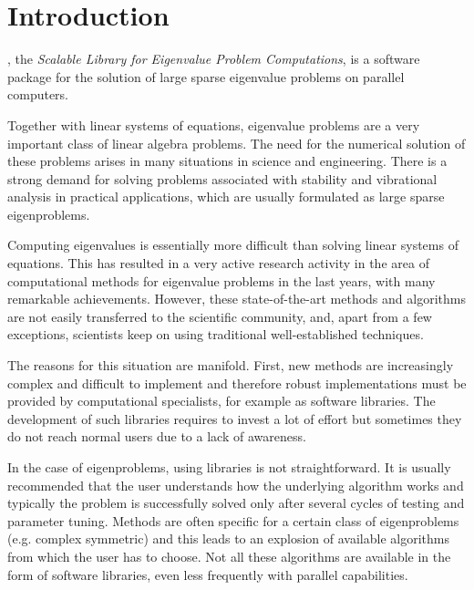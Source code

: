 \chapter{\label{cap:int}Introduction}

\noindent \slepc, the {\em Scalable Library for Eigenvalue Problem Computations}, is a software package for the solution of large sparse eigenvalue problems on parallel computers. 

	Together with linear systems of equations, eigenvalue problems are a very important class of linear algebra problems. The need for the numerical solution of these problems arises in many situations in science and engineering. There is a strong demand for solving  problems associated with stability and vibrational analysis in practical applications, which are usually formulated as large sparse eigenproblems.

	Computing eigenvalues is essentially more difficult than solving linear systems of equations. This has resulted in a very active research activity in the area of computational methods for eigenvalue problems in the last years, with many remarkable achievements. 
	However, these state-of-the-art methods and algorithms are not easily transferred to the scientific community, and, apart from a few exceptions, scientists keep on using traditional well-established techniques.
	
	The reasons for this situation are manifold. First, new methods are increasingly complex and difficult to implement and therefore robust implementations must be provided by computational specialists, for example as software libraries. The development of such libraries requires to invest a lot of effort but sometimes they do not reach normal users due to a lack of awareness.
	
	In the case of eigenproblems, using libraries is not straightforward. It is usually recommended that the user understands how the underlying algorithm works and typically the problem is successfully solved only after several cycles of testing and parameter tuning. Methods are often specific for a certain class of eigenproblems (e.g. complex symmetric) and this leads to an explosion of available algorithms from which the user has to choose. Not all these algorithms are available in the form of software libraries, even less frequently with parallel capabilities.
	
